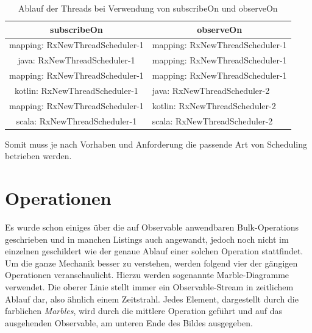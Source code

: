\begin{table}[]
	\centering
	\begin{tabular}{|c|l|}
		\hline
		\rowcolor[HTML]{C0C0C0} 
		subscribeOn                                           & \multicolumn{1}{c|}{\cellcolor[HTML]{C0C0C0}observeOn} \\ \hline
		mapping: RxNewThreadScheduler-1                       & mapping: RxNewThreadScheduler-1 \\ \hline
		java: RxNewThreadScheduler-1						  & mapping: RxNewThreadScheduler-1 \\ \hline
		mapping: RxNewThreadScheduler-1 					  & mapping: RxNewThreadScheduler-1 \\ \hline
		kotlin: RxNewThreadScheduler-1  					  & java: RxNewThreadScheduler-2    \\ \hline
		mapping: RxNewThreadScheduler-1                       & kotlin: RxNewThreadScheduler-2  \\ \hline
		scala: RxNewThreadScheduler-1                         & scala: RxNewThreadScheduler-2   \\ \hline
	\end{tabular}
	\caption{Ablauf der Threads bei Verwendung von subscribeOn und observeOn}
\label{schedulertable}
\end{table}

Somit muss je nach Vorhaben und Anforderung die passende Art von Scheduling betrieben werden. 
\section{Operationen}
Es wurde schon einiges über die auf Observable anwendbaren Bulk-Operations geschrieben und in manchen Listings auch angewandt, jedoch noch nicht im einzelnen geschildert wie der genaue Ablauf einer solchen Operation stattfindet. Um die ganze Mechanik besser zu verstehen, werden folgend vier der gängigen Operationen veranschaulicht. Hierzu werden sogenannte Marble-Diagramme verwendet. Die oberer Linie stellt immer ein Observable-Stream in zeitlichem Ablauf dar, also ähnlich einem Zeitstrahl. Jedes Element, dargestellt durch die farblichen \textit{Marbles}, wird durch die mittlere Operation geführt und auf das ausgehenden Observable, am unteren Ende des Bildes ausgegeben. 
